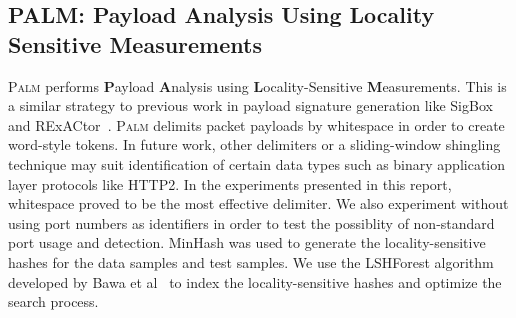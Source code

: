 \subsection{PALM: Payload Analysis Using Locality Sensitive Measurements}
\textsc{Palm} performs \textbf{P}ayload \textbf{A}nalysis using \textbf{L}ocality-Sensitive \textbf{M}easurements. This is a similar strategy to previous work in payload signature generation like SigBox~\cite{sigbox} and RExACtor~\cite{rexactor}. \textsc{Palm} delimits packet payloads by whitespace in order to create word-style tokens. In future work, other delimiters or a sliding-window shingling technique may suit identification of certain data types such as binary application layer protocols like HTTP2. In the experiments presented in this report, whitespace proved to be the most effective delimiter. We also experiment without using port numbers as identifiers in order to test the possiblity of non-standard port usage and detection. MinHash was used to generate the locality-sensitive hashes for the data samples and test samples. We use the LSHForest algorithm developed by Bawa et al~\cite{lshforest} to index the locality-sensitive hashes and optimize the search process.
